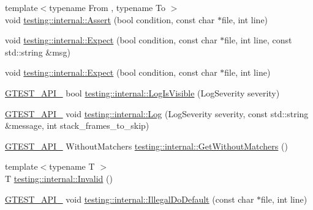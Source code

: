 \begin{DoxyCompactItemize}
\item 
{\footnotesize template$<$typename From , typename To $>$ }\\void \mbox{\hyperlink{namespacetesting_1_1internal_a7a259643b7f2d23ce2b757728df42c99}{testing\+::internal\+::\+Assert}} (bool condition, const char $\ast$file, int line)
\item 
void \mbox{\hyperlink{namespacetesting_1_1internal_ad93379317e10862a77b9fb90aa96e083}{testing\+::internal\+::\+Expect}} (bool condition, const char $\ast$file, int line, const std\+::string \&msg)
\item 
void \mbox{\hyperlink{namespacetesting_1_1internal_a0dfe8a755bd02aa5ea162764b61a9d97}{testing\+::internal\+::\+Expect}} (bool condition, const char $\ast$file, int line)
\item 
\mbox{\hyperlink{gtest-port_8h_aa73be6f0ba4a7456180a94904ce17790}{G\+T\+E\+S\+T\+\_\+\+A\+P\+I\+\_\+}} bool \mbox{\hyperlink{namespacetesting_1_1internal_a69ffdba5ee36743e88d8f89b79e566ff}{testing\+::internal\+::\+Log\+Is\+Visible}} (Log\+Severity severity)
\item 
\mbox{\hyperlink{gtest-port_8h_aa73be6f0ba4a7456180a94904ce17790}{G\+T\+E\+S\+T\+\_\+\+A\+P\+I\+\_\+}} void \mbox{\hyperlink{namespacetesting_1_1internal_a8a57ce0412334a3f487bbaa8321febbe}{testing\+::internal\+::\+Log}} (Log\+Severity severity, const std\+::string \&message, int stack\+\_\+frames\+\_\+to\+\_\+skip)
\item 
\mbox{\hyperlink{gtest-port_8h_aa73be6f0ba4a7456180a94904ce17790}{G\+T\+E\+S\+T\+\_\+\+A\+P\+I\+\_\+}} Without\+Matchers \mbox{\hyperlink{namespacetesting_1_1internal_ad4e02ea077a717f95a10a03c10272f1c}{testing\+::internal\+::\+Get\+Without\+Matchers}} ()
\item 
{\footnotesize template$<$typename T $>$ }\\T \mbox{\hyperlink{namespacetesting_1_1internal_a3316c24e8a79f5def3e85d763ae50854}{testing\+::internal\+::\+Invalid}} ()
\item 
\mbox{\hyperlink{gtest-port_8h_aa73be6f0ba4a7456180a94904ce17790}{G\+T\+E\+S\+T\+\_\+\+A\+P\+I\+\_\+}} void \mbox{\hyperlink{namespacetesting_1_1internal_aa67e1e9d28122eedffbb7b6636824f2d}{testing\+::internal\+::\+Illegal\+Do\+Default}} (const char $\ast$file, int line)
\end{DoxyCompactItemize}
